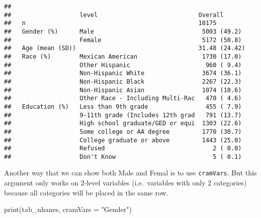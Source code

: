 \documentclass[
]{book}
\newenvironment{Shaded}{\begin{snugshade}}{\end{snugshade}}
\newcommand{\AttributeTok}[1]{\textcolor[rgb]{0.77,0.63,0.00}{#1}}
\newcommand{\FunctionTok}[1]{\textcolor[rgb]{0.00,0.00,0.00}{#1}}
\newcommand{\NormalTok}[1]{#1}
\newcommand{\StringTok}[1]{\textcolor[rgb]{0.31,0.60,0.02}{#1}}
\begin{document}
\begin{verbatim}
##                  
##                   level                            Overall      
##   n                                                10175        
##   Gender (%)      Male                              5003 (49.2) 
##                   Female                            5172 (50.8) 
##   Age (mean (SD))                                  31.48 (24.42)
##   Race (%)        Mexican American                  1730 (17.0) 
##                   Other Hispanic                     960 ( 9.4) 
##                   Non-Hispanic White                3674 (36.1) 
##                   Non-Hispanic Black                2267 (22.3) 
##                   Non-Hispanic Asian                1074 (10.6) 
##                   Other Race - Including Multi-Rac   470 ( 4.6) 
##   Education (%)   Less than 9th grade                455 ( 7.9) 
##                   9-11th grade (Includes 12th grad   791 (13.7) 
##                   High school graduate/GED or equi  1303 (22.6) 
##                   Some college or AA degree         1770 (30.7) 
##                   College graduate or above         1443 (25.0) 
##                   Refused                              2 ( 0.0) 
##                   Don't Know                           5 ( 0.1)
\end{verbatim}

Another way that we can show both Male and Femal is to use \texttt{cramVars}. But this argument only works on 2-level variables (i.e.~variables with only 2 categories) because all categories will be placed in the same row.

\begin{Shaded}
\begin{Highlighting}[]
\FunctionTok{print}\NormalTok{(tab\_nhanes, }
     \AttributeTok{cramVars =} \StringTok{"Gender"}\NormalTok{)}
\end{Highlighting}
\end{Shaded}
\end{document}
